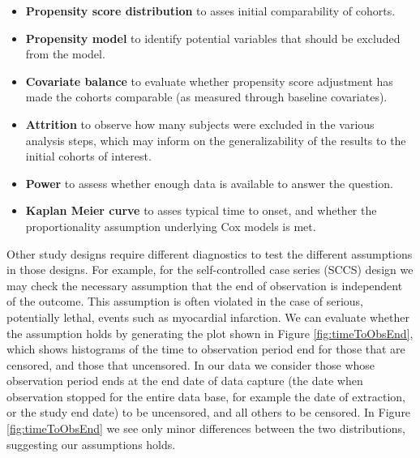 \documentclass[11pt]{book}
\providecommand{\tightlist}{%
  \setlength{\itemsep}{0pt}\setlength{\parskip}{0pt}}
\theoremstyle{definition}
\theoremstyle{definition}
\theoremstyle{definition}
\theoremstyle{remark}
\begin{document}
\begin{itemize}
\tightlist
\item
  \textbf{Propensity score distribution} to asses initial comparability of cohorts.
\item
  \textbf{Propensity model} to identify potential variables that should be excluded from the model.
\item
  \textbf{Covariate balance} to evaluate whether propensity score adjustment has made the cohorts comparable (as measured through baseline covariates).
\item
  \textbf{Attrition} to observe how many subjects were excluded in the various analysis steps, which may inform on the generalizability of the results to the initial cohorts of interest.
\item
  \textbf{Power} to assess whether enough data is available to answer the question.
\item
  \textbf{Kaplan Meier curve} to asses typical time to onset, and whether the proportionality assumption underlying Cox models is met.
\end{itemize}

Other study designs require different diagnostics to test the different assumptions in those designs. For example, for the self-controlled case series (SCCS) design we may check the necessary assumption that the end of observation is independent of the outcome. This assumption is often violated in the case of serious, potentially lethal, events such as myocardial infarction. We can evaluate whether the assumption holds by generating the plot shown in Figure \ref{fig:timeToObsEnd}, which shows histograms of the time to observation period end for those that are censored, and those that uncensored. In our data we consider those whose observation period ends at the end date of data capture (the date when observation stopped for the entire data base, for example the date of extraction, or the study end date) to be uncensored, and all others to be censored. In Figure \ref{fig:timeToObsEnd} we see only minor differences between the two distributions, suggesting our assumptions holds.
\end{document}
